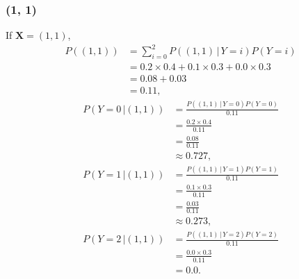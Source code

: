 \documentclass[10pt]{article}
\begin{document}
\subsubsection*{(1, 1)}
If $\textbf{X} = (1, 1)$, 
\begin{align*}
P((1, 1)) &= \sum_{i = 0}^2 P((1, 1) \, | \, Y = i)P(Y = i) \\
             &= 0.2 \times 0.4 + 0.1 \times 0.3 + 0.0 \times 0.3 \\
             &= 0.08 + 0.03 \\
             &= 0.11,
\end{align*}
\begin{align*}
P(Y = 0 \, | (1,1)) &= \frac{P((1, 1) \, | \, Y = 0)P(Y = 0)}{ 0.11 } \\
                           &= \frac{0.2 \times 0.4}{ 0.11 } \\
                           &= \frac{ 0.08 }{ 0.11 } \\
                           &\approx 0.727,
\end{align*}
\begin{align*}
P(Y = 1 \, | (1,1)) &= \frac{ P((1, 1) \, | \, Y = 1)P(Y = 1) }{ 0.11 } \\
                           &= \frac{ 0.1 \times 0.3 }{ 0.11 } \\
                           &= \frac{ 0.03 }{ 0.11 } \\
                           &\approx 0.273,
\end{align*}
\begin{align*}
P(Y = 2 \, | (1,1)) &= \frac{P((1, 1) \, | \, Y = 2)P(Y = 2)}{ 0.11 } \\
                           &= \frac{ 0.0 \times 0.3 }{ 0.11 } \\
                           &= 0.0.
\end{align*}
\end{document}
